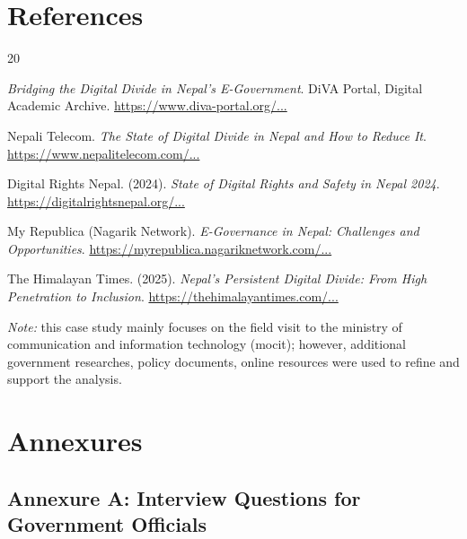 \documentclass[12pt,a4paper]{article}
\begin{document}
\newpage
\section{References}

\begin{thebibliography}{20}

\textit{Bridging the Digital Divide in Nepal's E-Government}. DiVA Portal, Digital Academic Archive.
\href{https://www.diva-portal.org/smash/record.jsf?pid=diva2\%3A1977098&dswid=-5328}{https://www.diva-portal.org/...}

Nepali Telecom. \textit{The State of Digital Divide in Nepal and How to Reduce It}. 
\href{https://www.nepalitelecom.com/digital-divide}{https://www.nepalitelecom.com/...}

Digital Rights Nepal. (2024). \textit{State of Digital Rights and Safety in Nepal 2024}. 
\href{https://digitalrightsnepal.org/wp-content/uploads/2025/05/STATE-OF-DIGITAL-RIGHTS-AND-SAFETY-IN-NEPAL-2024-1-1-2.pdf}{https://digitalrightsnepal.org/...}

My Republica (Nagarik Network). \textit{E-Governance in Nepal: Challenges and Opportunities}. 
\href{https://myrepublica.nagariknetwork.com/news/e-governance-in-nepal-challenges-and-opportunities-95-85.html}{https://myrepublica.nagariknetwork.com/...}

The Himalayan Times. (2025). \textit{Nepal's Persistent Digital Divide: From High Penetration to Inclusion}. 
\href{https://thehimalayantimes.com/opinion/nepals-persistent-digital-divide-from-high-penetration-to-inclusion}{https://thehimalayantimes.com/...}

\end{thebibliography}

\vspace{12pt}

\noindent\textit{Note:} this case study mainly focuses on the field visit to the ministry of communication and information technology (mocit); however, additional government researches, policy documents, online resources were used to refine and support the analysis.


\newpage
\section{Annexures}
\label{sec:annexures}

\subsection{Annexure A: Interview Questions for Government Officials}
\end{document}
